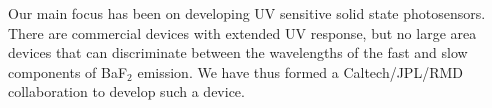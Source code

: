 Our main focus has been on developing UV sensitive solid state photosensors. There are commercial devices with extended UV response, but no large area devices that can discriminate between the wavelengths of the fast and slow components of BaF$_2$ emission. We have thus formed a Caltech/JPL/RMD collaboration to develop such a device.

